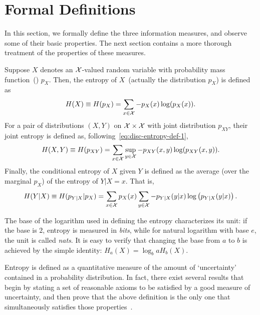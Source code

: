     \section{Formal Definitions}
        In this section, we formally define the three information measures, and observe some of their basic properties. The next section contains a more thorough treatment of the properties of these measures. 
        
        \begin{definition}
            \label{def:entropy-discrete}
            Suppose $X$ denotes an $\mathcal{X}$-valued random variable with  probability mass function~(\pmf) $p_X$. Then, the entropy of $X$~(actually the distribution $p_X$) is defined as 
            \begin{align}
                H(X) \equiv H(p_X) = \sum_{x \in \mathcal{X}} -p_X(x) \log(p_X(x)). \label{eq:disc-entropy-def-1}
            \end{align}
            For a pair of distributions $(X, Y)$ on $\mathcal{X} \times \mathcal{X}$ with joint distribution $p_{XY}$, their joint entropy is defined as, following~\eqref{eq:disc-entropy-def-1}, 
            \begin{align}
                H(X, Y) \equiv H(p_{XY}) = \sum_{x \in \mathcal{X}} \sup_{y \in \mathcal{X}} -p_{XY}(x, y) \log( p_{XY}(x, y)). 
            \end{align}
            Finally, the conditional entropy of $X$ given $Y$ is defined as the average (over the marginal $p_X$) of the entropy of $Y|X=x$. That is, 
            \begin{align}
                H(Y|X) \equiv H(p_{Y|X}|p_X) = \sum_{x \in \mathcal{X}} p_X(x) \sum_{y \in \mathcal{X}} -p_{Y|X}(y|x) \log \left( p_{Y|X}(y|x) \right). 
            \end{align}
        \end{definition}


        \begin{remark}
            \label{remark:unit-entropy}
            The base of the logarithm used in defining the entropy characterizes its unit: if the base is $2$, entropy is measured in \emph{bits}, while for natural logarithm with base $e$, the unit is called \emph{nats}. It is easy to verify that changing the base from $a$ to $b$ is achieved by the simple identity: $H_a(X) = \log_b a H_b(X)$. 
        \end{remark}    
        Entropy is defined as a quantitative measure of the amount of `uncertainty' contained in a probability distribution. In fact, there exist several results that begin by stating a set of reasonable axioms to be satisfied by a good measure of uncertainty, and then prove that the above definition is the only one that simultaneously satisfies those properties~\citep{csiszar2011information}. 


